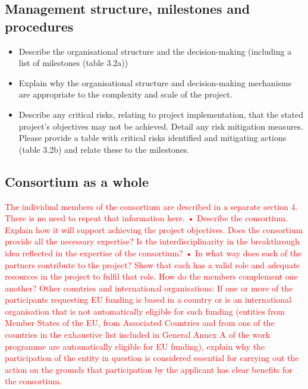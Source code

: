\documentclass[12pt, a4paper]{article} %
\begin{document}
\begin{itemize}
\begin{itemize}
\begin{itemize}
  \subsection{Management structure, milestones and procedures}
  \begin{itemize}
  \item Describe the organisational structure and the decision-making
    (including a list of milestones (table 3.2a))
  \item Explain why the organisational structure and decision-making
    mechanisms are appropriate to the complexity and scale of the
    project.
  \item Describe any critical risks, relating to project
    implementation, that the stated project's objectives may not be
    achieved. Detail any risk mitigation measures. Please provide a
    table with critical risks identified and mitigating actions (table
    3.2b) and relate these to the milestones.
  \end{itemize}

  \subsection{Consortium as a whole}

  \textcolor{red}{The individual members of the consortium are
    described in a separate section 4. There is no need to repeat that
    information here.  • Describe the consortium. Explain how it will
    support achieving the project objectives.  Does the consortium
    provide all the necessary expertise? Is the interdisciplinarity in
    the breakthrough idea reflected in the expertise of the
    consortium?  • In what way does each of the partners contribute to
    the project? Show that each has a valid role and adequate
    resources in the project to fulfil that role. How do the members
    complement one another?  Other countries and international
    organisations: If one or more of the participants requesting EU
    funding is based in a country or is an international organisation
    that is not automatically eligible for such funding (entities from
    Member States of the EU, from Associated Countries and from one of
    the countries in the exhaustive list included in General Annex A
    of the work programme are automatically eligible for EU funding),
    explain why the participation of the entity in question is
    considered essential for carrying out the action on the grounds
    that participation by the applicant has clear benefits for the
    consortium.}



\end{itemize}
\end{itemize}
\end{itemize}
\end{document}
